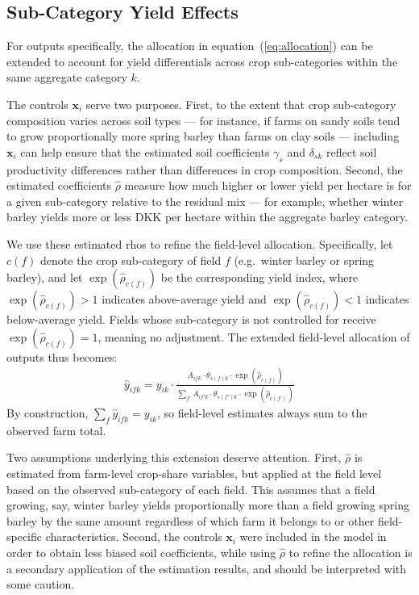 \documentclass{scrartcl}
\begin{document}
\newpage

\subsection*{Sub-Category Yield Effects}
For outputs specifically, the allocation in equation~(\ref{eq:allocation}) 
can be extended to account for yield differentials across crop sub-categories 
within the same aggregate category $k$.

The controls $\mathbf{x}_i$ serve two purposes.
First, to the extent that crop sub-category composition varies across soil types --- for instance, if farms on sandy soils tend to grow
proportionally more spring barley than farms on clay soils --- including
$\mathbf{x}_i$ can help ensure that the estimated soil coefficients $\gamma_s$
and $\delta_{sk}$ reflect soil productivity differences rather than
differences in crop composition.
Second, the estimated coefficients $\hat{\rho}$ measure how much higher or
lower yield per hectare is for a given sub-category relative to the residual
mix --- for example, whether winter barley yields more or less DKK per hectare within the aggregate barley category.

We use these estimated rhos to refine the field-level allocation.
Specifically, let $c(f)$ denote the crop sub-category of field $f$ (e.g.\ winter barley or spring barley), and let $\exp(\hat{\rho}_{c(f)})$ be the corresponding yield index, where $\exp(\hat{\rho}_{c(f)}) > 1$ indicates above-average yield and $\exp(\hat{\rho}_{c(f)}) < 1$ indicates below-average yield.
Fields whose sub-category is not controlled for receive $\exp(\hat{\rho}_{c(f)}) = 1$, meaning no adjustment.
The extended field-level allocation of outputs thus becomes:
\begin{align}
    \hat{y}_{ifk} = y_{ik} \cdot \frac{A_{ifk} \cdot \theta_{s(f)k} \cdot \exp(\hat{\rho}_{c(f)})}
    {\sum_{f'} A_{if'k} \cdot \theta_{s(f')k} \cdot \exp(\hat{\rho}_{c(f')})}
    \label{eq:allocation-extended}
\end{align}
By construction, $\sum_f \hat{y}_{ifk} = y_{ik}$, so field-level estimates always sum to the observed farm total.

Two assumptions underlying this extension deserve attention.
First, $\hat{\rho}$ is estimated from farm-level crop-share variables, 
but applied at the field level based on the observed sub-category of each field.
This assumes that a field growing, say, winter barley yields 
proportionally more than a field growing spring barley by the same amount 
regardless of which farm it belongs to or other field-specific characteristics.
Second, the controls $\mathbf{x}_i$ were included in the model in order to 
obtain less biased soil coefficients, while using $\hat{\rho}$ to refine the allocation is a secondary application of the estimation results, and should be interpreted with some caution.
\end{document}
